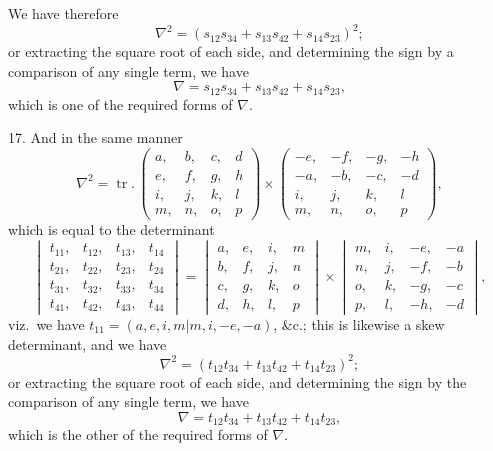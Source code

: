 \documentclass[11pt,a4paper]{article}
\theoremstyle{plain}
\DeclareMathOperator{\tr}{tr}
\begin{document}
We have therefore
\[
\nabla^2 = (s_{12}s_{34} + s_{13}s_{42} + s_{14}s_{23})^2;
\]
or extracting the square root of each side, and determining the sign by a comparison of any single term, we have
\[
\nabla = s_{12}s_{34} + s_{13}s_{42} + s_{14}s_{23},
\]
which is one of the required forms of $\nabla$.

17. And in the same manner
\[
\nabla^2 =
\tr.\,
\begin{pmatrix}
a, & b, & c, & d \\
e, & f, & g, & h \\
i, & j, & k, & l \\
m, & n, & o, & p
\end{pmatrix}
\times
\begin{pmatrix}
-e, & -f, & -g, & -h \\
-a, & -b, & -c, & -d \\
i, & j, & k, & l \\
m, & n, & o, & p
\end{pmatrix},
\]
which is equal to the determinant
\[
\begin{vmatrix}
t_{11}, & t_{12}, & t_{13}, & t_{14} \\
t_{21}, & t_{22}, & t_{23}, & t_{24} \\
t_{31}, & t_{32}, & t_{33}, & t_{34} \\
t_{41}, & t_{42}, & t_{43}, & t_{44}
\end{vmatrix}
=
\begin{vmatrix}
a, & e, & i, & m \\
b, & f, & j, & n \\
c, & g, & k, & o \\
d, & h, & l, & p
\end{vmatrix}
\times
\begin{vmatrix}
m, & i, & -e, & -a \\
n, & j, & -f, & -b \\
o, & k, & -g, & -c \\
p, & l, & -h, & -d
\end{vmatrix},
\]
viz.\ we have $t_{11} = (a,e,i,m  |  m,i,-e,-a)$, \&c.; this is likewise a skew determinant, and we have
\[
\nabla^2 = (t_{12}t_{34} + t_{13}t_{42} + t_{14}t_{23})^2;
\]
or extracting the square root of each side, and determining the sign by the comparison of any single term, we have
\[
\nabla = t_{12}t_{34} + t_{13}t_{42} + t_{14}t_{23},
\]
which is the other of the required forms of $\nabla$.
\end{document}
